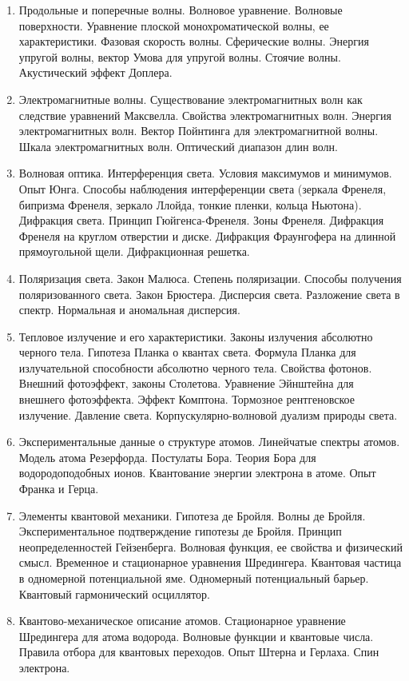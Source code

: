 \documentclass[12pt]{article}
\begin{document}
\begin{enumerate}
    \item Продольные и поперечные волны. Волновое уравнение. Волновые поверхности. Уравнение 
    плоской монохроматической волны, ее характеристики. Фазовая скорость волны. Сферические 
    волны. Энергия упругой волны, вектор Умова для упругой волны. Стоячие волны. Акустический 
    эффект Доплера. 

    \item Электромагнитные волны. Существование электромагнитных волн как следствие уравнений 
    Максвелла. Свойства электромагнитных волн. Энергия электромагнитных волн. Вектор 
    Пойнтинга для электромагнитной волны. Шкала электромагнитных волн. Оптический диапазон 
    длин волн. 

    \item Волновая оптика. Интерференция света. Условия максимумов и минимумов. Опыт Юнга. 
    Способы наблюдения интерференции света (зеркала Френеля, бипризма Френеля, зеркало 
    Ллойда, тонкие пленки, кольца Ньютона). Дифракция света. Принцип Гюйгенса-Френеля. Зоны 
    Френеля. Дифракция Френеля на круглом отверстии и диске. Дифракция Фраунгофера на 
    длинной прямоугольной щели. Дифракционная решетка. 
    
    \item Поляризация света. Закон Малюса. Степень поляризации. Способы получения 
    поляризованного света. Закон Брюстера. Дисперсия света. Разложение света в спектр. 
    Нормальная и аномальная дисперсия.

    \item Тепловое излучение и его характеристики. Законы излучения абсолютно черного тела. 
    Гипотеза Планка о квантах света. Формула Планка для излучательной способности абсолютно 
    черного тела. Свойства фотонов. Внешний фотоэффект, законы Столетова. Уравнение 
    Эйнштейна для внешнего фотоэффекта. Эффект Комптона. Тормозное рентгеновское излучение. 
    Давление света. Корпускулярно-волновой дуализм природы света.

    \item Экспериментальные данные о структуре атомов. Линейчатые спектры атомов. Модель атома 
    Резерфорда. Постулаты Бора. Теория Бора для водородоподобных ионов. Квантование энергии 
    электрона в атоме. Опыт Франка и Герца. 

    \item Элементы квантовой механики. Гипотеза де Бройля. Волны де Бройля. Экспериментальное 
    подтверждение гипотезы де Бройля. Принцип неопределенностей Гейзенберга. Волновая 
    функция, ее свойства и физический смысл. Временное и стационарное уравнения Шредингера. 
    Квантовая частица в одномерной потенциальной яме. Одномерный потенциальный барьер. 
    Квантовый гармонический осциллятор. 

    \item Квантово-механическое описание атомов. Стационарное уравнение Шредингера для атома 
    водорода. Волновые функции и квантовые числа. Правила отбора для квантовых переходов. 
    Опыт Штерна и Герлаха. Спин электрона.

\end{enumerate}
\end{document}
